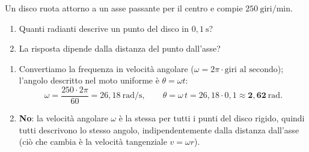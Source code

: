 \begin{question}[ID=1.4, subtitle={Disco che ruota a 250 giri/min — angolo descritto in 0,1 s}, tags={moto circolare, velocità angolare}, difficulty=facile]
Un disco ruota attorno a un asse passante per il centro e compie $250\ \mathrm{giri/min}$.
\begin{enumerate}
\item Quanti radianti descrive un punto del disco in $0{,}1\ \mathrm{s}$?
\item La risposta dipende dalla distanza del punto dall'asse?
\end{enumerate}
\begin{solution}
\begin{enumerate}
\item Convertiamo la frequenza in velocità angolare ($\omega = 2\pi\cdot\text{giri al secondo}$); l'angolo descritto nel moto uniforme è $\theta = \omega t$:
\[
\omega = \frac{250\cdot 2\pi}{60} = 26{,}18\ \mathrm{rad/s}, \qquad \theta = \omega\,t = 26{,}18\cdot 0{,}1 \approx \mathbf{2{,}62\ \mathrm{rad}}.
\]
\item \textbf{No}: la velocità angolare $\omega$ è la stessa per tutti i punti del disco rigido, quindi tutti descrivono lo stesso angolo, indipendentemente dalla distanza dall'asse (ciò che cambia è la velocità tangenziale $v = \omega r$).
\end{enumerate}
\end{solution}
\end{question}


